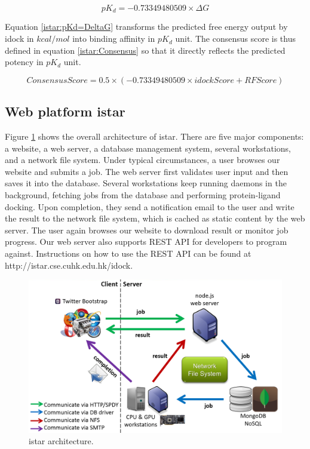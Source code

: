 \begin{equation}
\label{istar:pKd=DeltaG}
pK_d = -0.73349480509 \times \Delta G
\end{equation}

Equation \eqref{istar:pKd=DeltaG} transforms the predicted free energy output by idock in $kcal/mol$ into binding affinity in $pK_d$ unit. The consensus score is thus defined in equation \eqref{istar:Consensus} so that it directly reflects the predicted potency in $pK_d$ unit.

\begin{equation}
\label{istar:Consensus}
ConsensusScore = 0.5 \times (-0.73349480509 \times idockScore + RFScore)
\end{equation}

\subsection{Web platform istar}

Figure \ref{istar:Architecture} shows the overall architecture of istar. There are five major components: a website, a web server, a database management system, several workstations, and a network file system. Under typical circumstances, a user browses our website and submits a job. The web server first validates user input and then saves it into the database. Several workstations keep running daemons in the background, fetching jobs from the database and performing protein-ligand docking. Upon completion, they send a notification email to the user and write the result to the network file system, which is cached as static content by the web server. The user again browses our website to download result or monitor job progress. Our web server also supports REST API for developers to program against. Instructions on how to use the REST API can be found at http://istar.cse.cuhk.edu.hk/idock.

\begin{figure}
\centering
\includegraphics[width=\linewidth]{../istar/Architecture.png}
\caption{istar architecture.}
\label{istar:Architecture}
\end{figure}

